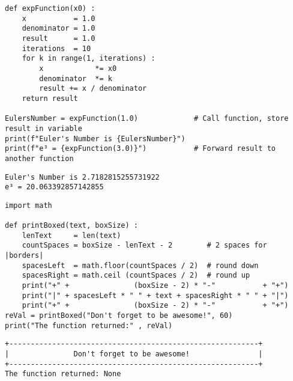 \begin{frame}[fragile]
%
\begin{codebox}
\begin{verbatim}
def expFunction(x0) :
    x           = 1.0
    denominator = 1.0
    result      = 1.0
    iterations  = 10
    for k in range(1, iterations) :
        x            *= x0
        denominator  *= k
        result += x / denominator
    return result

EulersNumber = expFunction(1.0)             # Call function, store result in variable
print(f"Euler's Number is {EulersNumber}")
print(f"e³ = {expFunction(3.0)}")           # Forward result to another function
\end{verbatim}
\end{codebox}

\begin{cmdbox}
\begin{verbatim}
Euler's Number is 2.7182815255731922
e³ = 20.063392857142855
\end{verbatim}
\end{cmdbox}
%
\end{frame}


\begin{frame}[fragile]
%
\begin{codebox}
\begin{verbatim}
import math

def printBoxed(text, boxSize) :
    lenText     = len(text)
    countSpaces = boxSize - lenText - 2        # 2 spaces for |borders|
    spacesLeft  = math.floor(countSpaces / 2)  # round down
    spacesRight = math.ceil (countSpaces / 2)  # round up
    print("+" +               (boxSize - 2) * "-"           + "+")
    print("|" + spacesLeft * " " + text + spacesRight * " " + "|")
    print("+" +               (boxSize - 2) * "-"           + "+")
reVal = printBoxed("Don't forget to be awesome!", 60)
print("The function returned:" , reVal)
\end{verbatim}
\end{codebox}

\begin{cmdbox}
\begin{verbatim}
+----------------------------------------------------------+
|               Don't forget to be awesome!                |
+----------------------------------------------------------+
The function returned: None
\end{verbatim}
\end{cmdbox}
%
\end{frame}

